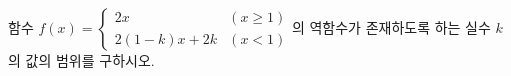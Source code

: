 함수 $f(x)=\begin{cases} 2x & (x\ge 1) \\ 2(1-k)x+2k & (x<1) \end{cases}$의 역함수가 존재하도록 하는 실수 $k$의 값의 범위를 구하시오.
